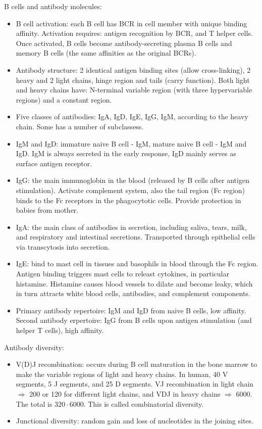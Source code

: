 \documentclass{report}
\begin{document}
B cells and antibody molecules:  
\begin{itemize}
	\item B cell activation: each B cell has BCR in cell member with unique binding affinity. Activation requires: antigen recognition by BCR, and T helper cells. Once activated, B cells become antibody-secreting plasma B cells and memory B cells (the same affinities as the original BCRs). 
	
	\item Antibody structure: 2 identical antigen binding sites (allow cross-linking), 2 heavy and 2 light chains, hinge region and tails (carry function). Both light and heavy chains have: N-terminal variable region (with three hypervariable regions) and a constant region. 
	
	\item Five classes of antibodies: IgA, IgD, IgE, IgG, IgM, according to the heavy chain. Some has a number of subclassess. 
	\item IgM and IgD: immature naive B cell - IgM, mature naive B cell - IgM and IgD. IgM is always secreted in the early response, IgD mainly serves as surface antigen receptor. 
	\item IgG: the main immunoglobin in the blood (released by B cells after antigen stimulation). Activate complement system, also the tail region (Fc region) binds to the Fc receptors in the phagocytotic cells. Provide protection in babies from mother. 
	\item IgA: the main class of antibodies in secretion, including saliva, tears, milk, and respiratory and intestinal secretions. Transported through epithelial cells via transcytosis into secretion. 
	\item IgE: bind to mast cell in tissues and basophils in blood through the Fc region. Antigen binding triggers mast cells to releast cytokines, in particular histamine. Histamine causes blood vessels to dilate and become leaky, which in turn attracts white blood cells, antibodies, and complement components. 
	\item Primary antibody repertoire: IgM and IgD from naive B cells, low affinity. Second antibody erpertoire: IgG from B cells upon antigen stimulation (and helper T cells), high affinity.
\end{itemize}

Antibody diversity: 
\begin{itemize}
	\item V(D)J recombination: occurs during B cell maturation in the bone marrow to make the variable regions of light and heavy chains. In human, 40 V segments, 5 J segments, and 25 D segments. VJ recombination in light chain $\Rightarrow$ 200 or 120 for different light chains, and VDJ in heavy chains $\Rightarrow$ 6000. The total is $320 \cdot 6000$. This is called combinatorial diversity. 
	\item Junctional diversity: random gain and loss of nucleotides in the joining sites. 
\end{itemize}
\end{document}
